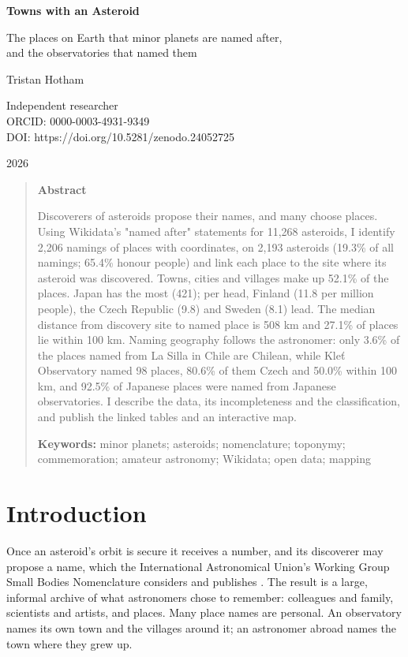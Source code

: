 \documentclass[11pt,a4paper]{article}
\begin{document}
\begin{center}
{\Large\bfseries Towns with an Asteroid\par}
\vspace{0.4em}
{\large The places on Earth that minor planets are named after,\\and the observatories that named them\par}
\vspace{1.2em}
{\large Tristan Hotham\par}
\vspace{0.3em}
{\small Independent researcher\\
ORCID: 0000-0003-4931-9349\\
DOI: https://doi.org/10.5281/zenodo.24052725\par}
\vspace{0.8em}
2026
\end{center}

\begin{quote}
\small
\begin{center}\textbf{Abstract}\end{center}
Discoverers of asteroids propose their names, and many choose places. Using Wikidata's "named after" statements for 11,268 asteroids, I identify 2,206 namings of places with coordinates, on 2,193 asteroids (19.3\% of all namings; 65.4\% honour people) and link each place to the site where its asteroid was discovered. Towns, cities and villages make up 52.1\% of the places. Japan has the most (421); per head, Finland (11.8 per million people), the Czech Republic (9.8) and Sweden (8.1) lead. The median distance from discovery site to named place is 508 km and 27.1\% of places lie within 100 km. Naming geography follows the astronomer: only 3.6\% of the places named from La Silla in Chile are Chilean, while Kle\v{t} Observatory named 98 places, 80.6\% of them Czech and 50.0\% within 100 km, and 92.5\% of Japanese places were named from Japanese observatories. I describe the data, its incompleteness and the classification, and publish the linked tables and an interactive map.

\textbf{Keywords:} minor planets; asteroids; nomenclature; toponymy; commemoration; amateur astronomy; Wikidata; open data; mapping
\end{quote}

\section{Introduction}
Once an asteroid's orbit is secure it receives a number, and its discoverer may propose a name, which the International Astronomical Union's Working Group Small Bodies Nomenclature considers and publishes \citep{mpc,wgsbn}. The result is a large, informal archive of what astronomers chose to remember: colleagues and family, scientists and artists, and places. Many place names are personal. An observatory names its own town and the villages around it; an astronomer abroad names the town where they grew up.
\end{document}
